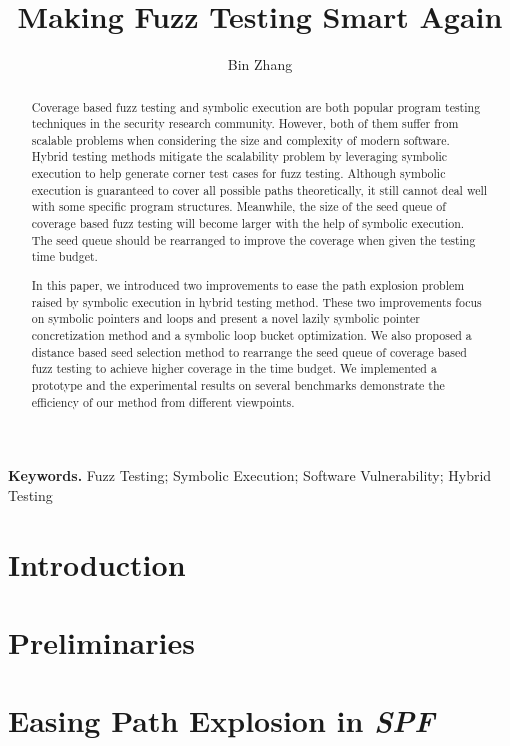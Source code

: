 \documentclass[a4paper]{article}
\begin{document}
\title{Making Fuzz Testing Smart Again}
\author{Bin Zhang}
\maketitle

\begin{abstract}
Coverage based fuzz testing and symbolic execution are both popular program testing techniques in the security research community. However, both of them suffer from scalable problems when considering the size and complexity of modern software. Hybrid testing methods mitigate the scalability problem by leveraging symbolic execution to help generate corner test cases for fuzz testing. Although symbolic execution is guaranteed to cover all possible paths theoretically, it still cannot deal well with some specific program structures. Meanwhile, the size of the seed queue of coverage based fuzz testing will become larger with the help of symbolic execution. The seed queue should be rearranged to improve the coverage when given the testing time budget.

In this paper, we introduced two improvements to ease the path explosion problem raised by symbolic execution in hybrid testing method. 
These two improvements focus on symbolic pointers and loops and present a novel lazily symbolic pointer concretization method and a symbolic loop bucket optimization. 
We also proposed a distance based seed selection method to rearrange the seed queue of coverage based fuzz testing to achieve higher coverage in the time budget. We implemented a prototype and the experimental results on several benchmarks demonstrate the efficiency of our method from different viewpoints.
\end{abstract}
\textbf{Keywords.} Fuzz Testing; Symbolic Execution; Software Vulnerability; Hybrid Testing

\section{Introduction} \label{sec:introduction}


\section{Preliminaries} \label{sec:preliminaries}


\section{Easing Path Explosion in \textit{SPF}} \label{sec:ease PE}

\end{document}
